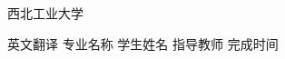 ﻿%
%
%


\begin{titlepage}
\voffset 2.7cm
\begin{center}
\begin{center}
\begin{minipage}[c]{2.64cm}
\centering
\resizebox{!}{0.9cm}{%
\parbox{0.54cm}{}
}
\end{minipage}
\hskip 0.8cm
\begin{minipage}[c]{8cm}
\fontsize{33}{33}\nwpulogo 西北工业大学
\end{minipage}
\end{center}
\vskip 0.7cm
\chuhao{}
\vskip 2.5cm
{
\chuhao\hei 英文翻译
}
\vskip 2.7cm
{
\sihao\song 专业名称
\vskip 0.7cm
\sihao\song 学生姓名
\vskip 0.7cm
\sihao\song 指导教师
\vskip 0.7cm
\sihao\song 完成时间
\vfill
}
\end{center}
\end{titlepage}

\song \normalsize

